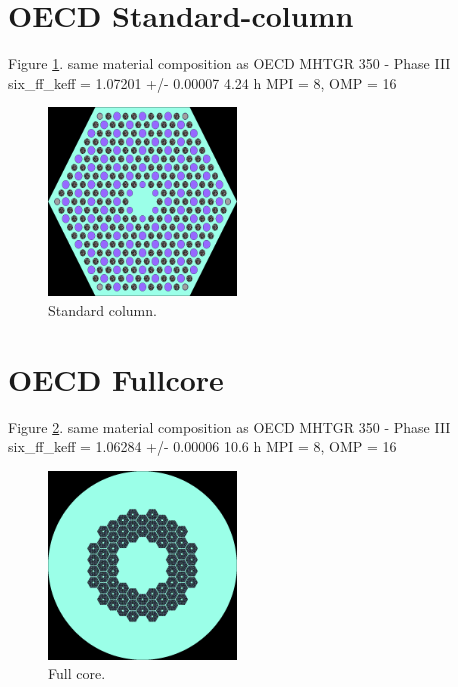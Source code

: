 \documentclass[11pt,letterpaper]{article}
\begin{document}
\section{OECD Standard-column}

Figure \ref{fig:stcol}.
same material composition as OECD MHTGR 350 - Phase III
six_ff_keff = 1.07201 +/- 0.00007
4.24 h MPI = 8, OMP = 16

\begin{figure}[htbp!]
	\centering
	\includegraphics[height=5cm]{oecd-standard-column_geom1.png}
	\caption{Standard column.}
	\label{fig:stcol}
\end{figure}

\section{OECD Fullcore}

Figure \ref{fig:fullcore}.
same material composition as OECD MHTGR 350 - Phase III
six_ff_keff = 1.06284 +/- 0.00006
10.6 h MPI = 8, OMP = 16

\begin{figure}[htbp!]
	\centering
	\includegraphics[height=5cm]{oecd-fullcore_geom1.png}
	\caption{Full core.}
	\label{fig:fullcore}
\end{figure}

\pagebreak


\end{document}
